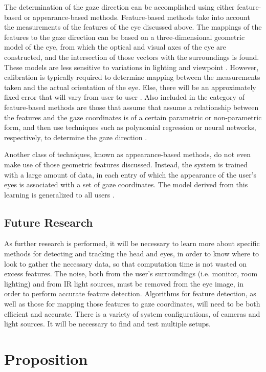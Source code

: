 \documentclass[12pt,conference,onecolumn]{IEEEtran}
\begin{document}
The determination of the gaze direction can be accomplished using either feature-based or appearance-based methods. Feature-based methods take into account the measurements of the features of the eye discussed above. The mappings of the features to the gaze direction can be based on a three-dimensional geometric model of the eye, from which the optical and visual axes of the eye are constructed, and the intersection of those vectors with the surroundings is found. These models are less sensitive to variations in lighting and viewpoint \cite{chennamma2013survey}. However, calibration is typically required to determine mapping between the measurements taken and the actual orientation of the eye. Else, there will be an approximately fixed error that will vary from user to user \cite{morimoto}. Also included in the category of feature-based methods are those that assume that assume a relationship between the features and the gaze coordinates is of a certain parametric or non-parametric form, and then use techniques such as polynomial regression or neural networks, respectively, to determine the gaze direction \cite{chennamma2013survey}.

Another class of techniques, known as appearance-based methods, do not even make use of those geometric features discussed. Instead, the system is trained with a large amount of data, in each entry of which the appearance of the user's eyes is associated with a set of gaze coordinates. The model derived from this learning is generalized to all users \cite{morimoto}.
\subsection{Future Research}

As further research is performed, it will be necessary to learn more about specific methods for detecting and tracking the head and eyes, in order to know where to look to gather the necessary data, so that computation time is not wasted on excess features. The noise, both from the user's surroundings (i.e. monitor, room lighting) and from IR light sources, must be removed from the eye image, in order to perform accurate feature detection. Algorithms for feature detection, as well as those for mapping those features to gaze coordinates, will need to be both efficient and accurate. There is a variety of system configurations, of cameras and light sources. It will be necessary to find and test multiple setups. 
\section{Proposition} \label{sec:proposition}



\end{document}
